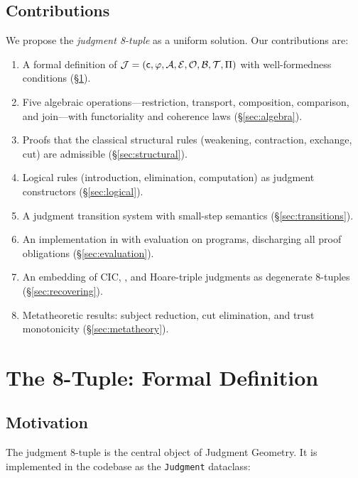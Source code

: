 \documentclass[11pt]{article}
\begin{document}
\subsection{Contributions}

We propose the \emph{judgment 8-tuple} as a uniform solution.  Our
contributions are:
\begin{enumerate}
  \item A formal definition of $\mathcal{J} = (\mathsf{c},\varphi,\mathcal{A},\mathcal{E},\mathcal{O},
        \mathcal{B},\mathcal{T},\Pi)$ with well-formedness conditions
        (\S\ref{sec:definition}).
  \item Five algebraic operations---restriction, transport, composition,
        comparison, and join---with functoriality and coherence laws
        (\S\ref{sec:algebra}).
  \item Proofs that the classical structural rules (weakening, contraction,
        exchange, cut) are admissible (\S\ref{sec:structural}).
  \item Logical rules (introduction, elimination, computation) as judgment
        constructors (\S\ref{sec:logical}).
  \item A judgment transition system with small-step semantics
        (\S\ref{sec:transitions}).
  \item An implementation in \Python{} with evaluation on \compTotalPrograms{} programs,
        discharging all \compTrustTotal{} proof obligations
        (\S\ref{sec:evaluation}).
  \item An embedding of CIC, \Fstar{}, and Hoare-triple judgments as
        degenerate 8-tuples (\S\ref{sec:recovering}).
  \item Metatheoretic results: subject reduction, cut elimination, and
        trust monotonicity (\S\ref{sec:metatheory}).
\end{enumerate}


\section{The 8-Tuple: Formal Definition}\label{sec:definition}

\subsection{Motivation}

The judgment 8-tuple is the central object of Judgment Geometry.
It is implemented in the \JuGeo{} codebase as the \texttt{Judgment} dataclass:
\end{document}
